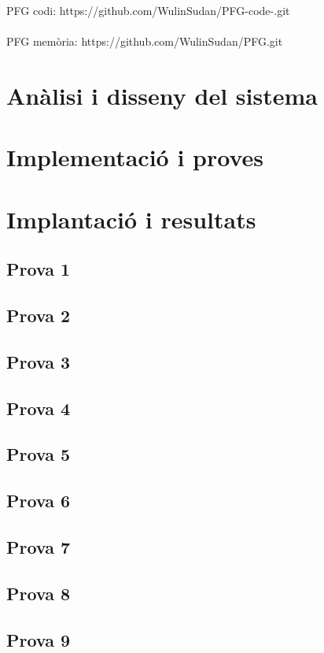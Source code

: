 \documentclass[a4paper,12pt,twoside]{ThesisStyle}
\begin{document}
PFG codi: https://github.com/WulinSudan/PFG-code-.git\\
\\
PFG memòria: https://github.com/WulinSudan/PFG.git




\chapter{Anàlisi i disseny del sistema}
\label{chp:analisi}



\chapter{Implementació i proves}
\label{chp:implementacio}



\chapter{Implantació i resultats}
\label{chp:implantacio}

\section{Prova 1}
\section{Prova 2}
\section{Prova 3}
\section{Prova 4}
\section{Prova 5}
\section{Prova 6}
\section{Prova 7}
\section{Prova 8}
\section{Prova 9}
\end{document}
